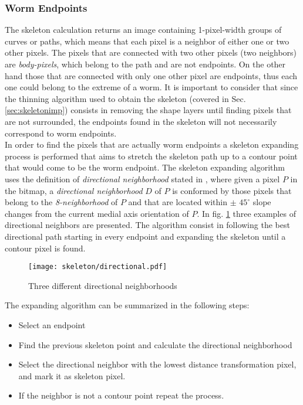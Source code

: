 \subsubsection*{Worm Endpoints}
\label{sec:wend}
The skeleton calculation returns an image 
containing 1-pixel-width groups of curves or paths, which means that each pixel 
is a neighbor of either one or two other pixels. The pixels that are connected with 
two other pixels (two neighbors) are \emph{body-pixels}, which belong 
to the path and are not endpoints. On the other hand those that are connected with 
only one other pixel are endpoints, thus each one could belong to the extreme of a
worm. It is important to consider that since the thinning algorithm used to obtain
the skeleton (covered in Sec. \ref{sec:skeletonimp}) consists in removing the shape
layers until finding pixels that are not surrounded, the endpoints found in the
skeleton will not necessarily correspond to worm endpoints.\\

In order to find the pixels that are actually worm endpoints a skeleton expanding process
is performed that aims to stretch the skeleton path up to a contour point that 
would come to be the worm endpoint. The skeleton expanding algorithm uses the definition
of \emph{directional neighborhood} stated in \cite[p.334]{maxima}, where given 
a pixel $P$ in the bitmap, a \emph{directional neighborhood} $D$ of $P$ is 
conformed by those pixels that belong to the \emph{8-neighborhood} of $P$ and that
are located within $\pm$ $45^{\circ}$ slope changes from the current medial axis 
orientation of $P$. In fig. \ref{fig:directional} three examples of directional
neighbors are presented. The algorithm consist in following the best directional path
starting in every endpoint and expanding the skeleton until a contour pixel is found.
 
\begin{figure}[h t b p ! H]
 \centering
   \texttt{[image: skeleton/directional.pdf]}
 \caption{Three different directional neighborhoods}
 \label{fig:directional}
\end{figure}

The expanding algorithm can be summarized in the following steps:
\begin{itemize}
\item Select an endpoint
\item Find the previous skeleton point and calculate the directional neighborhood
\item Select the directional neighbor with the lowest distance transformation pixel,
  and mark it as skeleton pixel.
\item If the neighbor is not a contour point repeat the process.
\end{itemize}

